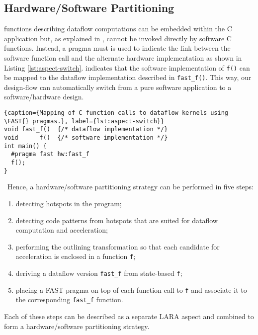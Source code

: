 \subsection{Hardware/Software Partitioning}
\label{sect:asp_hsp}
\FAST{} functions describing dataflow computations can be embedded
within the C application but, as explained in
, cannot be invoked directly by software C
functions.  Instead, a \FAST{} pragma must is used to indicate the
link between the software function call and the alternate hardware
implementation as shown in Listing  \ref{lst:aspect-switch}. indicates that the software
implementation of \texttt{f()} can be mapped to the dataflow
implementation described in \texttt{fast\_f()}. This way, our
design-flow can automatically switch from a pure software application
to a software/hardware design.

\lstset{style=MaxC}
\begin{lstlisting}{caption={Mapping of C function calls to dataflow kernels using \FAST{} pragmas.}, label={lst:aspect-switch}}
void fast_f()  {/* dataflow implementation */}
void      f()  {/* software implementation */}
int main() {
  #pragma fast hw:fast_f
  f();
}
\end{lstlisting}
\
Hence, a hardware/software partitioning strategy can be performed in
five steps:
\begin{enumerate}
  \item detecting hotspots in the program;
  \item detecting code patterns from hotspots that are suited for
    dataflow computation and acceleration;
  \item performing the outlining transformation so that each
    candidate for acceleration is enclosed in a function \texttt{f};
  \item deriving a dataflow version \texttt{fast\_f} from state-based
    \texttt{f};
  \item placing a FAST pragma on top of each function call to
    \texttt{f} and associate it to the corresponding \texttt{fast\_f}
    function.
\end{enumerate}

Each of these steps can be described as a separate LARA aspect and
combined to form a hardware/software partitioning strategy.



